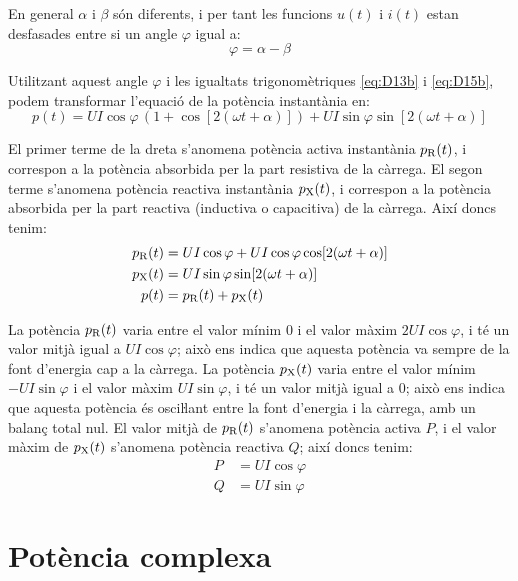 En general $\alpha$ i $\beta$ són diferents, i per tant les funcions $u(t)$ i $i(t)$ estan desfasades entre si un angle $\varphi$ igual a:
\begin{equation}
  \varphi = \alpha - \beta
\end{equation}

Utilitzant aquest angle $\varphi$ i les igualtats trigonomètriques \eqref{eq:D13b} i \eqref{eq:D15b}, podem transformar l'equació de la potència instantània en:
\begin{equation}
   p(t) = U I \cos\varphi \,(1 + \cos [2 (\omega t + \alpha)]) + U I \sin\varphi \sin[2 (\omega t + \alpha)]
\end{equation}

El primer terme de la dreta  s'anomena potència activa instantània $p_\mathrm{R}(t)$, i correspon a la potència absorbida per la part resistiva de la càrrega. El segon terme  s'anomena potència reactiva instantània $p_\mathrm{X}(t)$, i correspon a la potència absorbida per la part reactiva (inductiva o capacitiva) de la càrrega. Així doncs tenim:
\begin{subequations}
\begin{align}
  p_\mathrm{R}(t) &=  U I \cos\varphi + U I \cos\varphi \cos [2 (\omega t + \alpha)] \\
  p_\mathrm{X}(t) &=  U I \sin\varphi \sin[2 (\omega t + \alpha)] \\
    p(t) &= p_\mathrm{R}(t) + p_\mathrm{X}(t)
\end{align}
\end{subequations}
	
La potència $p_\mathrm{R}(t)$ varia entre el valor mínim 0 i el valor màxim $2 U I \cos\varphi$, i té un valor mitjà igual a $U I \cos\varphi$; això ens indica que aquesta potència va sempre de la font d'energia cap a la càrrega. La potència $p_\mathrm{X}(t)$ varia entre el valor mínim $-U I \sin\varphi$ i el valor  màxim $U I \sin\varphi$, i té un valor mitjà igual a 0; això ens indica que aquesta potència és osciŀlant entre la font d'energia i la càrrega, amb un balanç total nul. El valor mitjà de $p_\mathrm{R}(t)$ s'anomena potència activa $P$, i el valor màxim de $p_\mathrm{X}(t)$ s'anomena potència reactiva $Q$; així doncs tenim:
\begin{align}
  P &= U I \cos\varphi \\
  Q &= U I \sin\varphi
\end{align}

\section{Potència complexa}\label{sec:pot_complex} 


